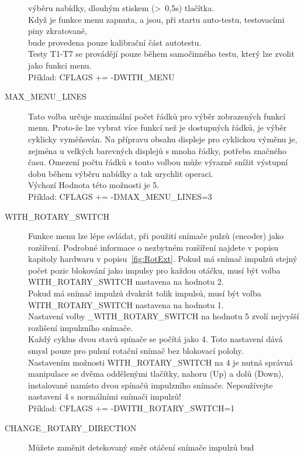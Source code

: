 \begin{description}
výběru nabídky, dlouhým stiskem (\textgreater~0,5s) tlačítka.\\
Když je funkce menu zapnuta, a jsou, při startu auto-testu, testovacími piny zkratované,\\
bude provedena pouze kalibrační část autotestu.\\
Testy T1-T7 se provádějí pouze během samočinného testu, který lze zvolit jako funkci menu.\\
Příklad: CFLAGS += -DWITH\_MENU
\vspace{-0,3cm}
 \item[MAX\_MENU\_LINES]
Tato volba určuje maximální počet řádků pro výběr zobrazených funkcí menu.
Proto-že lze vybrat více funkcí než je dostupných řádků, je výběr cyklicky vyměňován.
Na přípravu obsahu displeje pro cyklickou výměnu je, zejména u velkých barevných displejů
s mnoha řádky, potřeba značného času.
Omezení počtu řádků s touto volbou může výrazně snížit výstupní dobu během výběru nabídky
a tak urychlit operaci.\\
Výchozí Hodnota této možnosti je 5.\\
Příklad: CFLAGS += -DMAX\_MENU\_LINES=3
\vspace{-0,3cm}
  \item[WITH\_ROTARY\_SWITCH]  Funkce menu lze lépe ovládat, při použití snímače pulzů (encoder) jako rozšíření.
Podrobné informace o nezbytném rozšíření najdete v popisu kapitoly hardwaru v popisu~\ref{fig:RotExt}.
Pokud má snímač impulzů stejný počet pozic blokování jako impulsy pro každou otáčku, musí být
volba WITH\_ROTARY\_SWITCH nastavena na hodnotu 2.\\
Pokud má snímač impulzů dvakrát tolik impulsů, musí být volba WITH\_ROTARY\_SWITCH nastavena na hodnotu 1.\\
Nastavení volby \_WITH\_ROTARY\_SWITCH na hodnotu 5 zvolí nejvyšší rozlišení impulzního snímače.\\
Každý cyklus dvou stavů spínače se počítá jako 4. Toto nastavení  dává smysl pouze pro pulsní rotační snímač bez blokovací polohy.\\
Nastavením možnosti WITH\_ROTARY\_SWITCH na 4 je nutná správná manipulace se dvěma oddělenými
tlačítky, nahoru (Up) a dolů (Down), instalované namísto dvou spínačů impulzního snímače.
Nepoužívejte nastavení 4 s normálními snímači impulzů!\\
Příklad: CFLAGS += -DWITH\_ROTARY\_SWITCH=1
\vspace{-0,3cm}
  \item[CHANGE\_ROTARY\_DIRECTION]  Můžete zaměnit detekovaný směr otáčení snímače impulzů bud 

\end{description}
